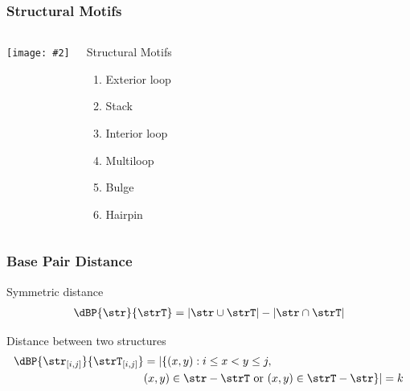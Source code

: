 \documentclass{beamer}
\newcommand{\slidefigure}[2][1]{\texttt{[image: \#2]}}
\begin{document}
\begin{frame}
  \frametitle{Structural Motifs}
  \begin{columns}
  \slidefigure{rnass}

  \begin{block}{Structural Motifs}
  \begin{enumerate}
  \item Exterior loop
  \item Stack
  \item Interior loop
  \item Multiloop
  \item Bulge
  \item Hairpin
  \end{enumerate}
  \end{block}
  \end{columns}
\end{frame}

\begin{frame}
  \frametitle{Base Pair Distance}
  \begin{block}{Symmetric distance}
  \begin{align*}
    \dBP{\str}{\strT} = |\str \cup \strT| - |\str \cap \strT|
  \end{align*}
  \end{block}

  \begin{block}{Distance between two structures}
  \begin{align*}
  \begin{split}
    \dBP{\str_{[i,j]}}{\strT_{[i,j]}} &=
  |\{ (x,y): i \leq x<y\leq j, \\
  & (x,y) \in \str - \strT \text{ or } (x,y) \in \strT - \str \}| = k
  \end{split}
  \end{align*}
  \end{block}
\end{frame}

\end{document}
